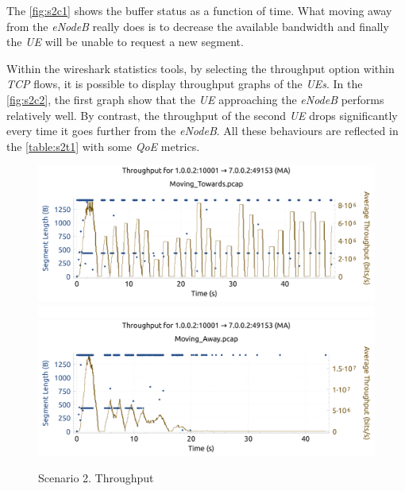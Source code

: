 The \autoref{fig:s2c1} shows the buffer status as a function of time. What moving away from 
the \textit{eNodeB} really does is to decrease the available bandwidth and finally the \textit{UE}
will be unable to request a new segment. 

Within the wireshark statistics tools, by selecting the throughput option within \textit{TCP} flows, 
it is possible to display throughput graphs of the \textit{UEs}. In the \autoref{fig:s2c2}, the first
graph show that the \textit{UE} approaching the \textit{eNodeB} performs relatively well. By contrast,
the throughput of the second \textit{UE} drops significantly every time it goes further from the \textit{eNodeB}.
All these behaviours are reflected in the \autoref{table:s2t1} with some \textit{QoE} metrics.

\begin{figure}[h]
    \centering    
    \includegraphics[width=\textwidth]{img/s2c2_1.pdf}
    \includegraphics[width=\textwidth]{img/space.png}
    \includegraphics[width=\textwidth]{img/s2c2_2.pdf}
    \caption{Scenario 2. Throughput}
    \label{fig:s2c2}
\end{figure}



